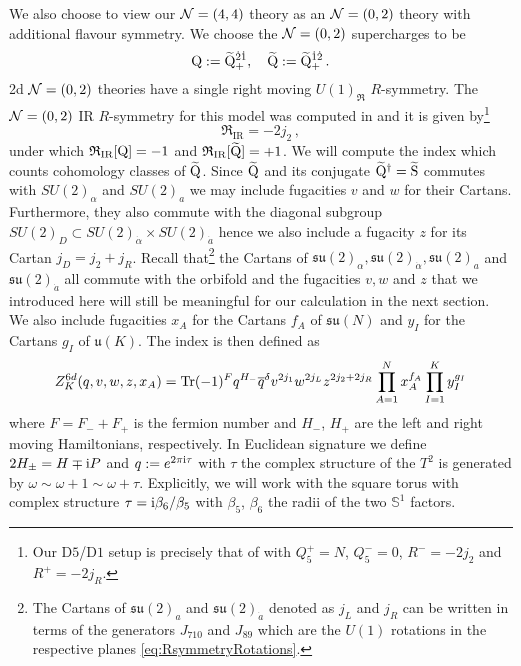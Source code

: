 \documentclass[main.tex]{subfiles}
\begin{document}
We also choose to view our $\mathcal{N}=(4,4)$ theory as an $\mathcal{N}=(0,2)$ theory with additional flavour symmetry. We choose the $\mathcal{N}=(0,2)$ supercharges to be 
\begin{equation}\label{eqn:02susycharges}
\mathrm{Q}:=\widetilde{\mathrm{Q}}_{+}^{\dot2\dot1}, \quad\widetilde{\mathrm{Q}}:=\widetilde{\mathrm{Q}}_{+}^{\dot1\dot2}\,.
\end{equation} 
2d $\mathcal{N}=(0,2)$ theories have a single right moving $U(1)_{\mathfrak{R}}$ $R$-symmetry. The $\mathcal{N}=(0,2)$ IR $R$-symmetry for this model was computed in \cite{Tong:2014yna} and it is given by\footnote{Our D$5$/D$1$ setup is precisely that of \cite{Tong:2014yna} with $Q_5^+=N$, $Q_5^-=0$, $R^-=-2j_2$ and $R^+=-2j_R$.}
\begin{equation}
\label{eq:IRrsymmetry}
\mathfrak{R}_{\text{IR}}=-2j_2\,,
\end{equation}
under which $\mathfrak{R}_{\text{IR}}[\mathrm{Q}]=-1$ and $\mathfrak{R}_{\text{IR}}[\widetilde{\mathrm{Q}}]=+1$.
We will compute the index which counts cohomology classes of $\widetilde{\mathrm{Q}}$. Since $\widetilde{\mathrm{Q}}$ and its conjugate $\widetilde{\mathrm{Q}}^{\dagger}=\widetilde{\mathrm{S}}$ commutes with $SU(2)_{\alpha}$ and $SU(2)_{a}$ we may include fugacities $v$ and $w$ for their Cartans. Furthermore, they also commute with the diagonal subgroup $SU(2)_D\subset SU(2)_{\dot\alpha}\times SU(2)_{\dot a}$ hence we also include a fugacity $z$ for its Cartan $j_D=j_2+j_R$.
Recall that\footnote{The Cartans of $\mathfrak{su}(2)_{a}$ and $\mathfrak{su}(2)_{\dot a}$ denoted as $j_L$ and $j_R$ can be written in terms of the generators $J_{710}$ and $J_{89}$ which are the $U(1)$ rotations in the respective planes  \eqref{eq:RsymmetryRotations}.} the Cartans of $\mathfrak{su}(2)_{\alpha},\mathfrak{su}(2)_{\dot\alpha},\mathfrak{su}(2)_{a}$ and $\mathfrak{su}(2)_{\dot a}$  all commute with the orbifold and the fugacities $v,w$ and $z$ that we introduced here will still be meaningful for our calculation in the next section.
 We also include fugacities $x_A$ for the Cartans $f_A$ of $\mathfrak{su}(N)$ and $y_I$ for the Cartans $g_I$ of $\mathfrak{u}(K)$. The index is then defined as
\begin{equation}\label{eqn:2starindex}
Z^{6d}_K(q,v,w,z,x_A)= \operatorname{Tr}(-1)^Fq^{H_-}\overline{q}^{\delta}v^{2j_1}w^{2j_L}z^{2j_2+2j_R}\prod_{A=1}^Nx_A^{f_A}\prod_{I=1}^Ky_{I}^{g_I}
\end{equation}
where $F=F_-+F_+$ is the fermion number and $H_-$, $H_+$ are the left and right moving Hamiltonians, respectively. In Euclidean signature we define $2H_{\pm}=H\mp\mathrm{i} P$ and $q:=e^{2\pi\mathrm{i}\tau}$ with $\tau$ the complex structure of the $T^2$ is generated by $\omega\sim \omega+1\sim \omega+\tau$. Explicitly, we will work with the square torus with complex structure $\tau=\mathrm{i}\beta_6/\beta_5$ with $\beta_5$, $\beta_6$ the radii of the two $\mathbb{S}^1$ factors.
\end{document}

